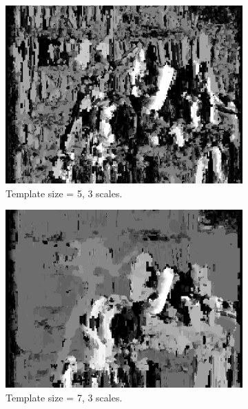 \documentclass[12pt,a4paper,oneside,final]{article}
\begin{document}
	\begin{figure}[H]
		\ContinuedFloat
		\begin{subfigure}[b]{0.24\textwidth}
			\includegraphics[width=\textwidth]{disparity_s3_k5set_1.png}
			\caption{Template size = 5, 3 scales.}
		\end{subfigure}
		\begin{subfigure}[b]{0.24\textwidth}
			\includegraphics[width=\textwidth]{disparity_s3_k7set_1.png}
			\caption{Template size = 7, 3 scales.}
		\end{subfigure}
		\begin{subfigure}[b]{0.24\textwidth}

\end{subfigure}
\end{figure}
\end{document}
